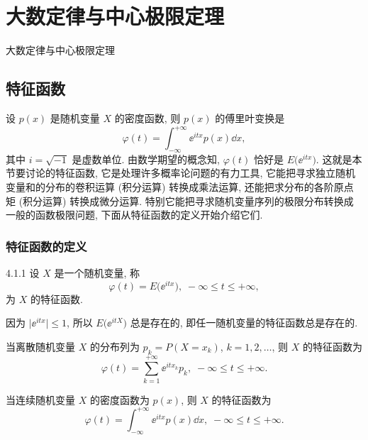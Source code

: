 \setcounter{chapter}{3}

\chapter{大数定律与中心极限定理\label{cha:4}}
大数定律与中心极限定理

\section{特征函数}

设 $ p (x) $ 是随机变量 $ X $ 的密度函数,
则 $ p (x) $ 的傅里叶变换是
\begin{equation*}
    \varphi (t) = \int_{-\infty}^{+\infty} \ee^{itx} p (x) \dd x,
\end{equation*}
其中 $ i = \sqrt{-1} $ 是虚数单位.
由数学期望的概念知,
$ \varphi (t) $ 恰好是 $ E \bigl( \ee^{itx} \bigr) $.
这就是本节要讨论的特征函数,
它是处理许多概率论问题的有力工具,
它能把寻求独立随机变量和的分布的卷积运算 (积分运算) 转换成乘法运算,
还能把求分布的各阶原点矩 (积分运算) 转换成微分运算.
特别它能把寻求随机变量序列的极限分布转换成一般的函数极限问题,
下面从特征函数的定义开始介绍它们.

\subsection{特征函数的定义}

\begin{definition}{}{4.1.1}
    设 $ X $ 是一个随机变量,
    称
    \begin{equation}\label{eq:4.1.1}
        \varphi (t) = E \bigl( \ee^{itx} \bigr), \; -\infty \leq t \leq +\infty,
    \end{equation}
    为 $ X $ 的{\heiti 特征函数}.
\end{definition}

因为 $ \lvert \ee^{itx} \rvert \leq 1 $,
所以 $ E \bigl( \ee^{itX} \bigr) $ 总是存在的,
即任一随机变量的特征函数总是存在的.

当离散随机变量 $ X $ 的分布列为 $ p_k = P ( X = x_k ) $, $ k = 1,2,\dotsc $,
则 $ X $ 的特征函数为
\begin{equation}\label{eq:4.1.2}
    \varphi (t) = \sum_{k=1}^{+\infty} \ee^{itx_k} p_k, \; -\infty \leq t \leq +\infty.
\end{equation}

当连续随机变量 $ X $ 的密度函数为 $ p (x) $,
则 $ X $ 的特征函数为
\begin{equation}\label{eq:4.1.3}
    \varphi (t) = \int_{-\infty}^{+\infty} \ee^{itx} p (x) \dd x, \; -\infty \leq t \leq +\infty.
\end{equation}

